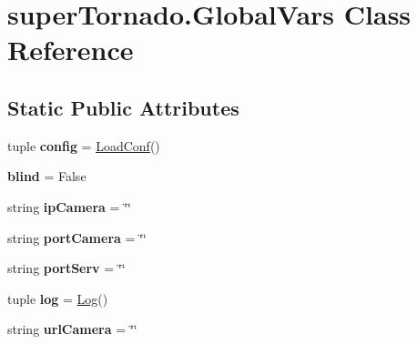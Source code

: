 \hypertarget{classsuper_tornado_1_1_global_vars}{\section{super\-Tornado.\-Global\-Vars Class Reference}
\label{classsuper_tornado_1_1_global_vars}
}
\subsection*{Static Public Attributes}
\begin{DoxyCompactItemize}
\item 
\hypertarget{classsuper_tornado_1_1_global_vars_a0091cf90c3955b9dd9917e441d6d307f}{tuple {\bfseries config} = \hyperlink{classm_1_1load_conf_1_1_load_conf}{Load\-Conf}()}\label{classsuper_tornado_1_1_global_vars_a0091cf90c3955b9dd9917e441d6d307f}

\item 
\hypertarget{classsuper_tornado_1_1_global_vars_a88c8b1da2e0b050af8a379a117440a44}{{\bfseries blind} = False}\label{classsuper_tornado_1_1_global_vars_a88c8b1da2e0b050af8a379a117440a44}

\item 
\hypertarget{classsuper_tornado_1_1_global_vars_a90ce11ba50f379aeb590c8e75a72a440}{string {\bfseries ip\-Camera} = \char`\"{}\char`\"{}}\label{classsuper_tornado_1_1_global_vars_a90ce11ba50f379aeb590c8e75a72a440}

\item 
\hypertarget{classsuper_tornado_1_1_global_vars_a1ac437cbfa5d3a6d35b079411ee6fb0a}{string {\bfseries port\-Camera} = \char`\"{}\char`\"{}}\label{classsuper_tornado_1_1_global_vars_a1ac437cbfa5d3a6d35b079411ee6fb0a}

\item 
\hypertarget{classsuper_tornado_1_1_global_vars_a46b35cd7e739aad2f78100e5c44be95a}{string {\bfseries port\-Serv} = \char`\"{}\char`\"{}}\label{classsuper_tornado_1_1_global_vars_a46b35cd7e739aad2f78100e5c44be95a}

\item 
\hypertarget{classsuper_tornado_1_1_global_vars_a027c191330c93fb0ce920d0c0cd7b8b2}{tuple {\bfseries log} = \hyperlink{classm_1_1log_1_1_log}{Log}()}\label{classsuper_tornado_1_1_global_vars_a027c191330c93fb0ce920d0c0cd7b8b2}

\item 
\hypertarget{classsuper_tornado_1_1_global_vars_af9c579f7873a30bd5ee9d3547fea1ecd}{string {\bfseries url\-Camera} = \char`\"{}\char`\"{}}\label{classsuper_tornado_1_1_global_vars_af9c579f7873a30bd5ee9d3547fea1ecd}


\end{DoxyCompactItemize}
